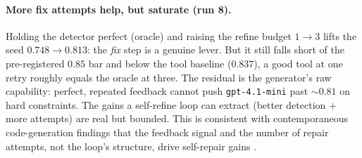 \documentclass[11pt]{article}
\begin{document}
\paragraph{More fix attempts help, but saturate (run 8).} Holding the detector perfect
(oracle) and raising the refine budget $1 \to 3$ lifts the seed $0.748 \to 0.813$: the
\emph{fix} step is a genuine lever. But it still falls short of the pre-registered $0.85$
bar and below the tool baseline ($0.837$), a good tool at one retry roughly equals the
oracle at three. The residual is the generator's raw capability: perfect, repeated feedback
cannot push \texttt{gpt-4.1-mini} past $\sim\!0.81$ on hard constraints. The gains a
self-refine loop can extract (better detection $+$ more attempts) are real but bounded.
This is consistent with contemporaneous
code-generation findings that the feedback signal and the number of repair attempts, not
the loop's structure, drive self-repair gains \citep{feedbackoverform2026,howmanytries2026}.
\end{document}
